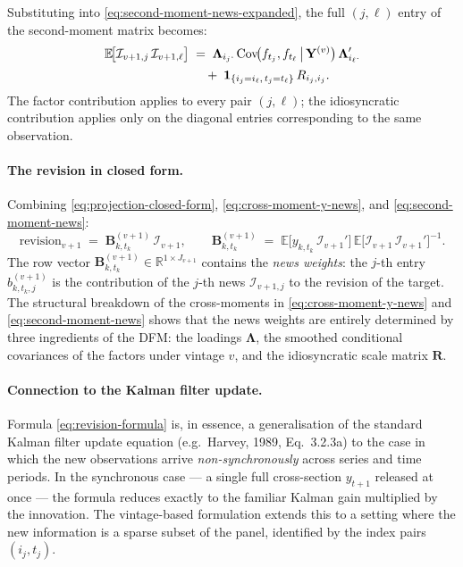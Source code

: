 \documentclass[11pt, a4paper, oneside]{article}
\begin{document}
Substituting into \eqref{eq:second-moment-news-expanded}, the full
$(j, \ell)$ entry of the second-moment matrix becomes:
\begin{align}
\mathbb{E}\!\big[\mathcal{I}_{v+1, j}\, \mathcal{I}_{v+1, \ell}\big] \;&=\;
\boldsymbol{\Lambda}_{i_j \cdot} \,
\mathrm{Cov}\!\big(f_{t_j}, f_{t_\ell} \,\big|\, \mathbf{Y}^{(v)}\big) \,
\boldsymbol{\Lambda}_{i_\ell \cdot}' \notag \\[2pt]
&\quad+\; \mathbf{1}_{\{i_j = i_\ell,\, t_j = t_\ell\}}\, R_{i_j, i_j}.
\label{eq:second-moment-news}
\end{align}
The factor contribution applies to every pair $(j, \ell)$; the
idiosyncratic contribution applies only on the diagonal entries
corresponding to the same observation.

\paragraph{The revision in closed form.}
Combining \eqref{eq:projection-closed-form},
\eqref{eq:cross-moment-y-news}, and \eqref{eq:second-moment-news}:
\begin{equation}
\boxed{\;\;
\text{revision}_{v+1} \;=\;
\mathbf{B}_{k, t_k}^{(v+1)}\, \mathcal{I}_{v+1},
\qquad
\mathbf{B}_{k, t_k}^{(v+1)} \;=\;
\mathbb{E}\!\big[y_{k, t_k}\, \mathcal{I}_{v+1}'\big]\,
\mathbb{E}\!\big[\mathcal{I}_{v+1}\, \mathcal{I}_{v+1}'\big]^{-1}.
\;\;}
\label{eq:revision-formula}
\end{equation}
The row vector
$\mathbf{B}_{k, t_k}^{(v+1)} \in \mathbb{R}^{1 \times J_{v+1}}$
contains the \emph{news weights}: the $j$-th entry
$b_{k, t_k, j}^{(v+1)}$ is the contribution of the $j$-th news
$\mathcal{I}_{v+1, j}$ to the revision of the target. The
structural breakdown of the cross-moments in
\eqref{eq:cross-moment-y-news} and \eqref{eq:second-moment-news}
shows that the news weights are entirely determined by three
ingredients of the DFM: the loadings $\boldsymbol{\Lambda}$, the
smoothed conditional covariances of the factors under vintage $v$,
and the idiosyncratic scale matrix $\mathbf{R}$.

\paragraph{Connection to the Kalman filter update.}
Formula \eqref{eq:revision-formula} is, in essence, a generalisation
of the standard Kalman filter update equation (e.g.\ Harvey, 1989,
Eq.\ 3.2.3a) to the case in which the new observations arrive
\emph{non-synchronously} across series and time periods. In the
synchronous case — a single full cross-section $y_{t+1}$ released
at once — the formula reduces exactly to the familiar Kalman gain
multiplied by the innovation. The vintage-based formulation extends
this to a setting where the new information is a sparse subset of
the panel, identified by the index pairs $(i_j, t_j)$.
\end{document}
